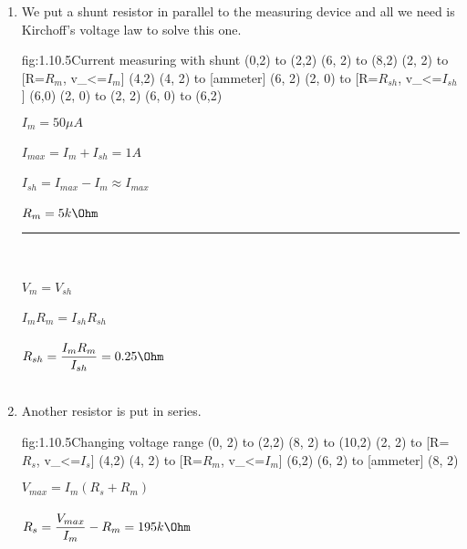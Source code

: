 \documentclass{article}
\begin{document}
   \begin{enumerate}
        \item
        We put a shunt resistor in parallel to the measuring device and all we need is Kirchoff's voltage law to solve this one.

        \begin{circuit}{fig:1.10.5}{Current measuring with shunt}
                (0,2) to (2,2)
                (6, 2) to (8,2)
                (2, 2) to [R=$R_{m}$, v_<=$I_{m}$] (4,2)
                (4, 2) to [ammeter] (6, 2)
                (2, 0) to [R=$R_{sh}$, v_<=$I_{sh}$] (6,0)
                (2, 0) to (2, 2)
                (6, 0) to (6,2)
        \end{circuit}

        $I_{m} = 50 \mu A$ \\\\
        $I_{max} = I_{m} + I_{sh} = 1 A$ \\\\
        $I_{sh} = I_{max} - I_{m} \approx I_{max}$ \\\\
        $R_{m} = 5k \Ohm$ \\
        \noindent\rule{4cm}{.1pt} \\\\
        $V_{m} = V_{sh}$ \\\\
        $I_{m} R_{m} = I_{sh} R_{sh}$ \\\\
        $R_{sh} =\dfrac{ I_{m} R_{m} } { I_{sh} } = 0.25 \Ohm$ \\\\

        \item
         Another resistor is put in series.

        \begin{circuit}{fig:1.10.5}{Changing voltage range}
                (0, 2) to (2,2)
                (8, 2) to (10,2)
                (2, 2) to [R=$R_{s}$, v_<=$I_{s}$] (4,2)
                (4, 2) to [R=$R_{m}$, v_<=$I_{m}$] (6,2)
                (6, 2) to [ammeter] (8, 2)
        \end{circuit}

        $V_{max} = I_{m} (R_{s} + R_{m})$\\\\
        $R_{s} = \dfrac{V_{max}}{ I_{m} } - R_{m} = 195k \Ohm$

    \end{enumerate}
\end{document}
